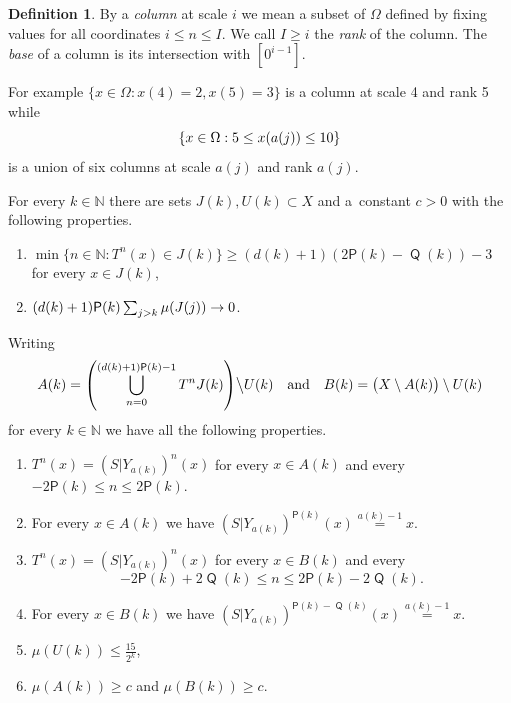 \documentclass[10pt]{amsart}
\theoremstyle{definition}\newtheorem{defi}[theo]{Definition}\newtheorem{rema}[theo]{Remark}\newtheorem{exam}[theo]{Example}\newtheorem{exem}[theo]{Example}\newtheorem{nota}[theo]{Notation}
\DeclareMathOperator{\Q}{\mathsf{Q}}
\newcommand{\N}{\mathbb{N}}
\renewcommand{\P}{\mathsf{P}}
\let\originalleft\left
\let\originalright\right
\renewcommand{\left}{\mathopen{}\mathclose\bgroup\originalleft}
\renewcommand{\right}{\aftergroup\egroup\originalright}
\renewcommand*{\to}{\mathchoice{\longrightarrow}{\rightarrow}{\rightarrow}{\rightarrow}}
\newcommand*{\relabel}{\renewcommand{\labelenumi}{(\theenumi)}}
\newcommand*{\PJenumi}{\renewcommand*{\theenumi}{PJ\arabic{enumi}}\relabel}
\begin{document}
\begin{defi}
By a
\emph{column} at scale $i$ we mean a subset of $\Omega$ defined by fixing values for all coordinates $i \le n \le I$. We call $I \ge i$ the
\emph{rank} of the column. The
\emph{base} of a column is its intersection with $[0^{i-1}]$.
\end{defi}


For example $\{ x \in \Omega : x(4) = 2, x(5) = 3 \}$ is a column at scale 4 and rank 5 while
\[
\left\{ x \in \Omega : 5 \le x(a(j)) \le 10 \right\}
\]
is a union of six columns at scale $a(j)$ and rank $a(j)$.

\begin{prop}\label{prop:joining_prep}
For every $k \in \N$ there are sets $J(k), U(k) \subset X$ and a~constant $c>0$ with the following properties.
\begin{enumerate}\PJenumi
\item\label{jt:return}
$\min \{ n \in \N : T^n(x) \in J(k) \} \ge (d(k)+1)(2\P(k) - \Q(k))-3$ for every $x \in J(k)$,
\item\label{jt:shrinking}
$(d(k)+1) \P(k) \sum_{j > k} \mu(J(j)) \to 0$.
\end{enumerate}
Writing
\[
A(k) = \left(\bigcup_{n=0}^{(d(k)+1)\P(k)-1} T^n J(k)\right)
\big\backslash U(k)
\quad \text{and} \quad B(k) = \bigl(X \setminus A(k)\bigr) \setminus U(k)
\]
for every $k \in \N$ we have all the following properties.
\begin{enumerate}\PJenumi
\setcounter{enumi}{2}
\item\label{jt:left}
$T^n(x) = (S|Y_{a(k)})^n(x)$ for every $x \in A(k)$ and every $-2 \P(k) \le n \le 2 \P(k).$
\item \label{conc:same left}
For every $x \in A(k)$ we have $(S|Y_{a(k)})^{\P(k)}(x) \overset{a(k)-1}{=}x$.
\item\label{jt:right}
$T^n(x) = (S|Y_{a(k)})^n(x)$ for every $x \in B(k)$ and every
\[
-2\P(k) + 2\Q(k) \le n \le 2\P(k) - 2\Q(k).
\]
\item \label{conc:same right}
For every $x \in B(k)$ we have $(S|Y_{a(k)})^{\P(k)-\Q(k)}(x) \overset{a(k)-1}{=}x$.
\item\label{jt:discard}
$\mu(U(k)) \le \frac {15} {2^k}$,
\item\label{jt:proportion}
$\mu(A(k)) \ge c$ and $\mu(B(k)) \ge c$.
\end{enumerate}
\end{prop}
\end{document}
